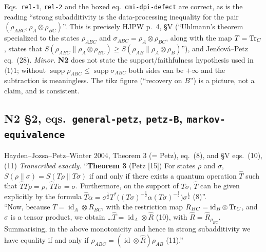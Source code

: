 \documentclass[11pt]{article}
\newcommand{\NII}{\textbf{N2}}
\newcommand{\loc}[1]{{\small\texttt{#1}}}
\newcommand{\id}{\operatorname{id}}
\newcommand{\supp}{\operatorname{supp}}
\newcommand{\1}{\mathbf 1}
\begin{document}
\begin{verdictok}
Eqs.~\loc{rel-1}, \loc{rel-2} and the boxed eq.~\loc{cmi-dpi-defect} are correct, as is the reading
``strong subadditivity is the data-processing inequality for the pair $(\rho_{ABC},\rho_A\otimes\rho_{BC})$''.
This is precisely HJPW p.~4, \S V (``Uhlmann's theorem specialized to the states $\rho_{ABC}$ and
$\sigma_{ABC}=\rho_A\otimes\rho_{BC}$, along with the map $T=\operatorname{Tr}_C$, states that
$S(\rho_{ABC}\|\rho_A\otimes\rho_{BC})\ge S(\rho_{AB}\|\rho_A\otimes\rho_B)$''), and Jen\v{c}ov\'a--Petz
eq.~(28).
\emph{Minor.} \NII{} does not state the support/faithfulness hypothesis used in $\langle1\rangle1$;
without $\supp\rho_{ABC}\le\supp\sigma_{ABC}$ both sides can be $+\infty$ and the subtraction is
meaningless. The tikz figure (``recovery on $B$'') is a picture, not a claim, and is consistent.
\end{verdictok}

\subsection{N2 \S2, eqs.\ \loc{general-petz}, \loc{petz-B}, \loc{markov-equivalence}}

\begin{citedbox}{Hayden--Jozsa--Petz--Winter 2004, Theorem 3 (= Petz), eq.~(8), and \S V eqs.~(10),(11)}
\emph{Transcribed exactly.} ``\textbf{Theorem 3} (Petz [15]) For states $\rho$ and $\sigma$,
$S(\rho\|\sigma)=S(T\rho\|T\sigma)$ if and only if there exists a quantum operation $\widehat T$ such
that $\widehat TT\rho=\rho$, $\widehat TT\sigma=\sigma$. Furthermore, on the support of $T\sigma$,
$\widehat T$ can be given explicitly by the formula
$\widehat T\alpha=\sigma^{\frac12}T^*\bigl((T\sigma)^{-\frac12}\alpha(T\sigma)^{-\frac12}\bigr)\sigma^{\frac12}$ (8)''.\\[2pt]
``Now, because $T=\id_A\otimes R_{BC}$, with the restriction map $R_{BC}=\id_B\otimes\Tr_C$, and
$\sigma$ is a tensor product, we obtain \dots $\widehat T=\id_A\otimes\widehat R$ (10), with
$\widehat R=\widehat R_{\rho_{BC}}$. Summarising, in the above monotonicity and hence in strong
subadditivity we have equality if and only if $\rho_{ABC}=(\id\otimes\widehat R)\rho_{AB}$ (11).''\\[2pt]
\end{citedbox}
\end{document}
